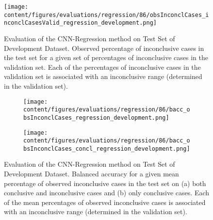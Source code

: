 \begin{figure}[h]
  \centering
  \texttt{[image: content/figures/evaluations/regression/86/obsInconclCases\_inconclCasesValid\_regression\_development.png]}
  \caption{Evaluation of the CNN-Regression method on Test Set of Development Dataset.
  Observed percentage of inconclusive cases in the test set 
  for a given set of percentages of inconclusive cases in the validation set.
  Each of the percentages of inconclusive cases in the validation set is associated 
  with an inconclusive range (determined in the validation set).} 
  \label{fig:obsInconclCases_inconclCasesValid_regression_development}
\end{figure} 


\begin{figure}[t]
  \begin{subfigure}{0.9\textwidth}
    \centering
    \texttt{[image: content/figures/evaluations/regression/86/bacc\_obsInconclCases\_regression\_development.png]}
    \subcaption{}
    \label{fig:bacc_obsInconclCases_regression_development}
  \end{subfigure}
  \hfill
  \begin{subfigure}{0.9\textwidth}
    \centering
    \texttt{[image: content/figures/evaluations/regression/86/bacc\_obsInconclCases\_concl\_regression\_development.png]}
    \subcaption{}
    \label{fig:bacc_obsInconclCases_concl_regression_development}
  \end{subfigure}

  \caption{Evaluation of the CNN-Regression method on Test Set of Development Dataset.
  Balanced accuracy for a given mean percentage of observed inconclusive cases in the test set on 
  (a) both conclusive and inconclusive cases and (b) only conclusive cases. 
  Each of the mean percentages of observed inconclusive cases is associated with an inconclusive range (determined in the validation set). }
  \label{fig:bacc_obsInconclCases_regression_development_full}
\end{figure}





